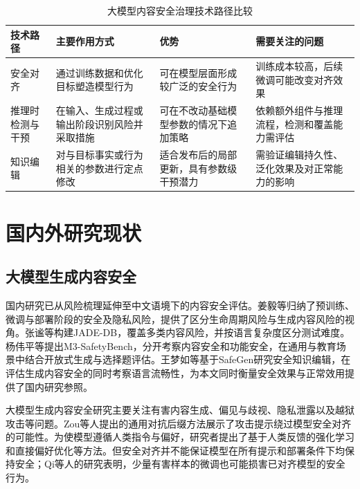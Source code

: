 \begin{table}[htbp]
  \centering
  \caption{大模型内容安全治理技术路径比较}
  \label{tab:chap1-route}
  \begin{tabular}{@{}>{\raggedright\arraybackslash}p{}>{\raggedright\arraybackslash}p{}>{\raggedright\arraybackslash}p{}>{\raggedright\arraybackslash}p{}@{}}
    \hline
    技术路径 & 主要作用方式 & 优势 & 需要关注的问题 \\
    \hline
    安全对齐 & 通过训练数据和优化目标塑造模型行为 & 可在模型层面形成较广泛的安全行为 & 训练成本较高，后续微调可能改变对齐效果 \\
    推理时检测与干预 & 在输入、生成过程或输出阶段识别风险并采取措施 & 可在不改动基础模型参数的情况下追加策略 & 依赖额外组件与推理流程，检测和覆盖能力需评估 \\
    知识编辑 & 对与目标事实或行为相关的参数进行定点修改 & 适合发布后的局部更新，具有参数级干预潜力 & 需验证编辑持久性、泛化效果及对正常能力的影响 \\
    \hline
  \end{tabular}
\end{table}

\section{国内外研究现状}

\subsection{大模型生成内容安全}

国内研究已从风险梳理延伸至中文语境下的内容安全评估。姜毅等归纳了预训练、微调与部署阶段的安全及隐私风险，提供了区分生命周期风险与生成内容风险的视角\cite{jiang2025llmsafety}。张谧等构建JADE-DB，覆盖多类内容风险，并按语言复杂度区分测试难度\cite{zhang2024jadedb}。杨伟平等提出M3-SafetyBench，分开考察内容安全和功能安全，在通用与教育场景中结合开放式生成与选择题评估\cite{yang2025m3safety}。王梦如等基于SafeGen研究安全知识编辑，在评估生成内容安全的同时考察语言流畅性，为本文同时衡量安全效果与正常效用提供了国内研究参照\cite{wangmengru2024}。

大模型生成内容安全研究主要关注有害内容生成、偏见与歧视、隐私泄露以及越狱攻击等问题。Zou等人提出的通用对抗后缀方法展示了攻击提示绕过模型安全对齐的可能性\cite{zou2023gcg}。为使模型遵循人类指令与偏好，研究者提出了基于人类反馈的强化学习和直接偏好优化等方法\cite{ouyang2022instruct,rafailov2023dpo}。但安全对齐并不能保证模型在所有提示和部署条件下均保持安全；Qi等人的研究表明，少量有害样本的微调也可能损害已对齐模型的安全行为\cite{qi2023finetuning}。

